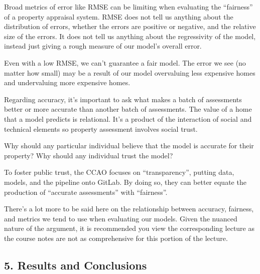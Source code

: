\documentclass[
  letterpaper,
  DIV=11,
  numbers=noendperiod]{scrreprt}
\begin{document}
Broad metrics of error like RMSE can be limiting when evaluating the
``fairness'' of a property appraisal system. RMSE does not tell us
anything about the distribution of errors, whether the errors are
positive or negative, and the relative size of the errors. It does not
tell us anything about the regressivity of the model, instead just
giving a rough measure of our model's overall error.

Even with a low RMSE, we can't guarantee a fair model. The error we see
(no matter how small) may be a result of our model overvaluing less
expensive homes and undervaluing more expensive homes.

Regarding accuracy, it's important to ask what makes a batch of
assessments better or more accurate than another batch of assessments.
The value of a home that a model predicts is relational. It's a product
of the interaction of social and technical elements so property
assessment involves social trust.

Why should any particular individual believe that the model is accurate
for their property? Why should any individual trust the model?

To foster public trust, the CCAO focuses on ``transparency'', putting
data, models, and the pipeline onto GitLab. By doing so, they can better
equate the production of ``accurate assessments'' with ``fairness''.

There's a lot more to be said here on the relationship between accuracy,
fairness, and metrics we tend to use when evaluating our models. Given
the nuanced nature of the argument, it is recommended you view the
corresponding lecture as the course notes are not as comprehensive for
this portion of the lecture.

\subsection{5. Results and Conclusions}\label{results-and-conclusions}
\end{document}
